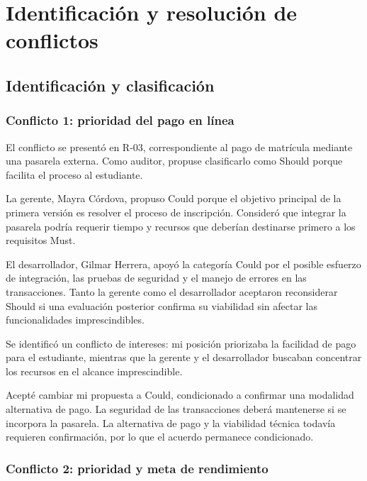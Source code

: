 \documentclass[12pt,a4paper]{article}
\begin{document}

\section{Identificación y resolución de conflictos}

\subsection{Identificación y clasificación}

\subsubsection{Conflicto 1: prioridad del pago en línea}

El conflicto se presentó en R-03, correspondiente al
pago de matrícula mediante una pasarela externa.
Como auditor, propuse clasificarlo como Should porque
facilita el proceso al estudiante.

La gerente, Mayra Córdova, propuso Could porque el
objetivo principal de la primera versión es resolver
el proceso de inscripción. Consideró que integrar
la pasarela podría requerir tiempo y recursos que
deberían destinarse primero a los requisitos Must.

El desarrollador, Gilmar Herrera, apoyó la categoría
Could por el posible esfuerzo de integración,
las pruebas de seguridad y el manejo de errores
en las transacciones. Tanto la gerente como el
desarrollador aceptaron reconsiderar Should si
una evaluación posterior confirma su viabilidad
sin afectar las funcionalidades imprescindibles.

Se identificó un conflicto de intereses: mi posición
priorizaba la facilidad de pago para el estudiante,
mientras que la gerente y el desarrollador buscaban
concentrar los recursos en el alcance imprescindible.

Acepté cambiar mi propuesta a Could, condicionado
a confirmar una modalidad alternativa de pago.
La seguridad de las transacciones deberá mantenerse
si se incorpora la pasarela. La alternativa de pago
y la viabilidad técnica todavía requieren confirmación,
por lo que el acuerdo permanece condicionado.

\subsubsection{Conflicto 2: prioridad y meta de rendimiento}
\end{document}
